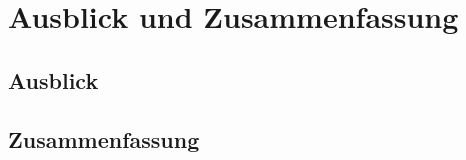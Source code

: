 \cleardoublepage
\chapter{Ausblick und Zusammenfassung}
\label{ch:AusblickZsmfassung}

\section{Ausblick}
\label{sec:Ausblick }

\section{Zusammenfassung}
\label{sec:Zsmf}


